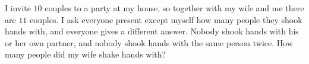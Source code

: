 I invite $10$ couples to a party at my house, so together with my wife and me there are $11$ couples. I ask everyone present except myself how many people they shook hands with, and everyone gives a different answer. Nobody shook hands with his or her own partner, and nobody shook hands with the same person twice. How many people did my wife shake hands with?
